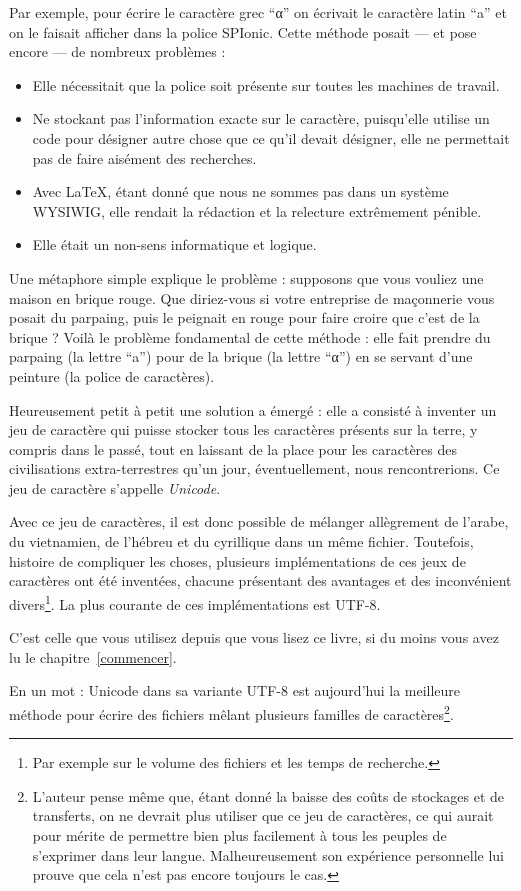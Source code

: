 Par exemple, pour écrire le caractère grec \enquote{α} on écrivait le caractère latin \enquote{a} et on le faisait afficher dans la police SPIonic. Cette méthode posait --- et pose encore --- de nombreux problèmes :
\begin{itemize}
\item Elle nécessitait que la police soit présente sur toutes les machines de travail.
\item Ne stockant pas l'information exacte sur le caractère, puisqu'elle utilise un code pour désigner autre chose que ce qu'il devait désigner, elle ne permettait pas  de faire aisément des recherches.
\item Avec \LaTeX, étant donné que nous ne sommes pas dans un système WYSIWIG, elle rendait la rédaction et la relecture extrêmement pénible.
\item Elle était un non-sens informatique et logique. 
\end{itemize}

Une métaphore simple explique le problème : supposons que vous vouliez une maison en brique rouge. Que diriez-vous si votre entreprise de maçonnerie vous posait du parpaing, puis le peignait en rouge pour faire croire que c'est de la brique ? Voilà le problème fondamental de cette méthode : elle fait prendre du parpaing (la lettre \enquote{a}) pour de la brique (la lettre \enquote{α}) en se servant d'une peinture (la police de caractères).

Heureusement petit à petit une solution a émergé : elle a consisté à inventer un jeu de caractère qui puisse stocker tous les caractères présents sur la terre, y compris dans le passé, tout en laissant de la place pour les caractères des civilisations extra-terrestres qu'un jour, éventuellement, nous rencontrerions. Ce jeu de caractère s'appelle \emph{Unicode}.

Avec ce jeu de caractères, il est donc possible de mélanger allègrement de l'arabe, du vietnamien, de l'hébreu et du cyrillique dans un même fichier. Toutefois, histoire de compliquer les choses, plusieurs implémentations de ces jeux de caractères ont été inventées, chacune présentant des avantages et des inconvénient divers\footnote{Par exemple sur le volume des fichiers et les temps de recherche.}. La plus courante de ces implémentations est UTF-8.

C'est celle que vous utilisez depuis que vous lisez ce livre, si du moins vous avez lu le chapitre~\ref{commencer}.

En un mot : Unicode dans sa variante UTF-8 est aujourd'hui la meilleure méthode pour écrire des fichiers mêlant plusieurs familles de caractères\footnote{L'auteur pense même que, étant donné la baisse des coûts de stockages et de transferts, on ne devrait plus utiliser que ce jeu de caractères, ce qui aurait pour mérite de permettre bien plus facilement à tous les peuples de s'exprimer dans leur langue. Malheureusement son expérience personnelle lui prouve que cela n'est pas encore toujours le cas.}.

